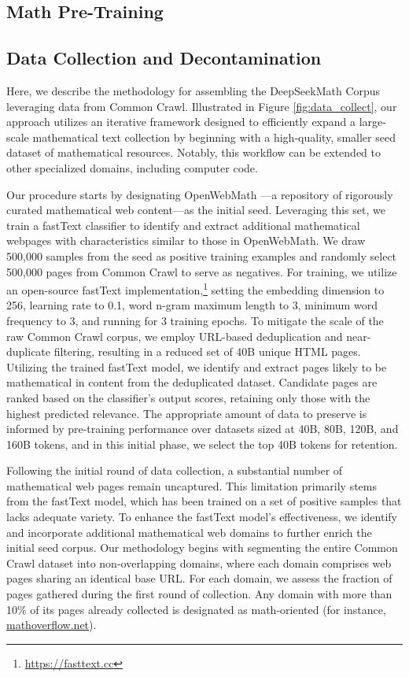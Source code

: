 \begin{itemize}[topsep=0pt]
\section{Math Pre-Training}

\subsection{Data Collection and Decontamination} 

Here, we describe the methodology for assembling the DeepSeekMath Corpus leveraging data from Common Crawl. Illustrated in Figure \ref{fig:data_collect}, our approach utilizes an iterative framework designed to efficiently expand a large-scale mathematical text collection by beginning with a high-quality, smaller seed dataset of mathematical resources. Notably, this workflow can be extended to other specialized domains, including computer code.

Our procedure starts by designating OpenWebMath \citep{openwebmath}—a repository of rigorously curated mathematical web content—as the initial seed. Leveraging this set, we train a fastText classifier \citep{joulin2016fasttext} to identify and extract additional mathematical webpages with characteristics similar to those in OpenWebMath. We draw 500,000 samples from the seed as positive training examples and randomly select 500,000 pages from Common Crawl to serve as negatives. For training, we utilize an open-source fastText implementation,\footnote{\url{https://fasttext.cc}} setting the embedding dimension to 256, learning rate to 0.1, word n-gram maximum length to 3, minimum word frequency to 3, and running for 3 training epochs. To mitigate the scale of the raw Common Crawl corpus, we employ URL-based deduplication and near-duplicate filtering, resulting in a reduced set of 40B unique HTML pages. Utilizing the trained fastText model, we identify and extract pages likely to be mathematical in content from the deduplicated dataset. Candidate pages are ranked based on the classifier’s output scores, retaining only those with the highest predicted relevance. The appropriate amount of data to preserve is informed by pre-training performance over datasets sized at 40B, 80B, 120B, and 160B tokens, and in this initial phase, we select the top 40B tokens for retention.

Following the initial round of data collection, a substantial number of mathematical web pages remain uncaptured. This limitation primarily stems from the fastText model, which has been trained on a set of positive samples that lacks adequate variety. To enhance the fastText model’s effectiveness, we identify and incorporate additional mathematical web domains to further enrich the initial seed corpus. Our methodology begins with segmenting the entire Common Crawl dataset into non-overlapping domains, where each domain comprises web pages sharing an identical base URL. For each domain, we assess the fraction of pages gathered during the first round of collection. Any domain with more than 10\% of its pages already collected is designated as math-oriented (for instance, \url{mathoverflow.net}).


\end{itemize}
